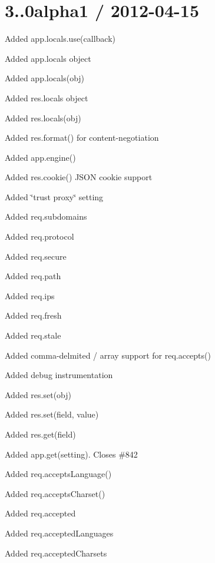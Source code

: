 \section*{3..\+0alpha1 / 2012-\/04-\/15 }


\begin{DoxyItemize}
\item Added {\ttfamily app.\+locals.\+use(callback)}
\item Added {\ttfamily app.\+locals} object
\item Added {\ttfamily app.\+locals(obj)}
\item Added {\ttfamily res.\+locals} object
\item Added {\ttfamily res.\+locals(obj)}
\item Added {\ttfamily res.\+format()} for content-\/negotiation
\item Added {\ttfamily app.\+engine()}
\item Added {\ttfamily res.\+cookie()} J\+S\+O\+N cookie support
\item Added \char`\"{}trust proxy\char`\"{} setting
\item Added {\ttfamily req.\+subdomains}
\item Added {\ttfamily req.\+protocol}
\item Added {\ttfamily req.\+secure}
\item Added {\ttfamily req.\+path}
\item Added {\ttfamily req.\+ips}
\item Added {\ttfamily req.\+fresh}
\item Added {\ttfamily req.\+stale}
\item Added comma-\/delmited / array support for {\ttfamily req.\+accepts()}
\item Added debug instrumentation
\item Added {\ttfamily res.\+set(obj)}
\item Added {\ttfamily res.\+set(field, value)}
\item Added {\ttfamily res.\+get(field)}
\item Added {\ttfamily app.\+get(setting)}. Closes \#842
\item Added {\ttfamily req.\+accepts\+Language()}
\item Added {\ttfamily req.\+accepts\+Charset()}
\item Added {\ttfamily req.\+accepted}
\item Added {\ttfamily req.\+accepted\+Languages}
\item Added {\ttfamily req.\+accepted\+Charsets}

\end{DoxyItemize}

